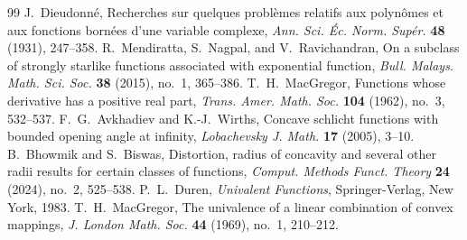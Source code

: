\documentclass[10pt,a4paper]{amsart}
\begin{document}
\begin{thebibliography}{99}
 J.~Dieudonn\'e, Recherches sur quelques probl\`emes relatifs aux polyn\^omes et aux fonctions born\'ees d'une variable complexe, \emph{Ann. Sci. \'Ec. Norm. Sup\'er.} \textbf{48} (1931), 247--358.
 R.~Mendiratta, S.~Nagpal, and V.~Ravichandran, On a subclass of strongly starlike functions associated with exponential function, \emph{Bull. Malays. Math. Sci. Soc.} \textbf{38} (2015), no.~1, 365--386.
 T.~H.~MacGregor, Functions whose derivative has a positive real part, \emph{Trans. Amer. Math. Soc.} \textbf{104} (1962), no.~3, 532--537.
 F.~G.~Avkhadiev and K.-J.~Wirths, Concave schlicht functions with bounded opening angle at infinity, \emph{Lobachevsky J. Math.} \textbf{17} (2005), 3--10.
 B.~Bhowmik and S.~Biswas, Distortion, radius of concavity and several other radii results for certain classes of functions, \emph{Comput. Methods Funct. Theory} \textbf{24} (2024), no.~2, 525--538.
 P.~L.~Duren, \emph{Univalent Functions}, Springer-Verlag, New York, 1983.
 T.~H.~MacGregor, The univalence of a linear combination of convex mappings, \emph{J. London Math. Soc.} \textbf{44} (1969), no.~1, 210--212.
\end{thebibliography}
\end{document}
